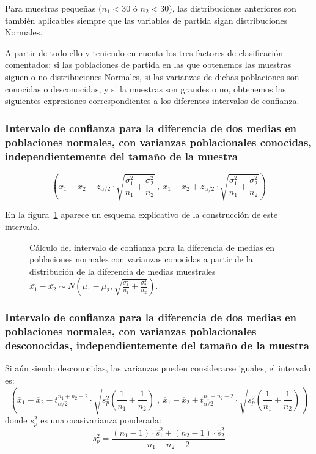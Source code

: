Para muestras pequeñas ($n_1<30$ ó $n_2<30$), las distribuciones anteriores son también aplicables siempre que las
variables de partida sigan distribuciones Normales.

A partir de todo ello y teniendo en cuenta los tres factores de clasificación comentados: si las poblaciones de partida
en las que obtenemos las muestras siguen o no distribuciones Normales, si las varianzas de dichas poblaciones son
conocidas o desconocidas, y si la muestras son grandes o no, obtenemos las siguientes expresiones correspondientes a los
diferentes intervalos de confianza.


\subsubsection {Intervalo de confianza para la diferencia de dos medias en poblaciones normales, con varianzas
poblacionales conocidas, independientemente del tamaño de la muestra}
\[
\left( \overline{x}_{1}-\overline{x}_{2}-z_{\alpha /2}\cdot 
\sqrt{\dfrac{\sigma_{1}^{2}}{n_{1}}+\dfrac{\sigma_{2}^{2}}{n_{2}}}\ ,\
\overline{x}_{1}-\overline{x}_{2}+z_{\alpha/2}\cdot \sqrt{\dfrac{\sigma_{1}^{2}}{n_{1}}+\dfrac{\sigma
_{2}^{2}}{n_{2}}}\right)
\]

En la figura~\ref{intervalodiferencia} aparece un esquema explicativo de la construcción de este intervalo.

\begin{figure}[h!]
\begin{center}
\scalebox{0.8}{}
\caption{Cálculo del intervalo de confianza para la diferencia de medias en poblaciones normales con varianzas conocidas a partir de la
distribución de la diferencia de medias muestrales $\bar{x_1}-\bar{x_2}\sim
N(\mu_1-\mu_2,\sqrt{\frac{\sigma_1^2}{n_1}+\frac{\sigma_2^2}{n_2}})$.}
\label{intervalodiferencia}
\end{center}
\end{figure}

\subsubsection {Intervalo de confianza para la diferencia de dos medias en poblaciones normales, con varianzas
poblacionales desconocidas, independientemente del tamaño de la muestra}
Si aún siendo desconocidas, las varianzas pueden considerarse iguales, el intervalo es:
\[
\left( \overline{x}_{1}-\overline{x}_{2}-t_{\alpha
/2}^{n_{1}+n_{2}-2}\cdot
\sqrt{s_{p}^{2}\left( \dfrac{1}{n_{1}}+\dfrac{1}{n_{2}}\right) }\ ,\ \overline{
x}_{1}-\overline{x}_{2}+t_{\alpha /2}^{n_{1}+n_{2}-2}\cdot \sqrt{
s_{p}^{2}\left( \dfrac{1}{n_{1}}+\dfrac{1}{n_{2}}\right) }\right)
\]
donde $s_{p}^{2}$ es una cuasivarianza ponderada:
\[
s_{p}^{2}=\dfrac{\left( n_{1}-1\right) \cdot \hat s_{1}^{2}+\left(n_{2}-1\right) \cdot
\hat s_{2}^{2}}{n_{1}+n_{2}-2}
\]

